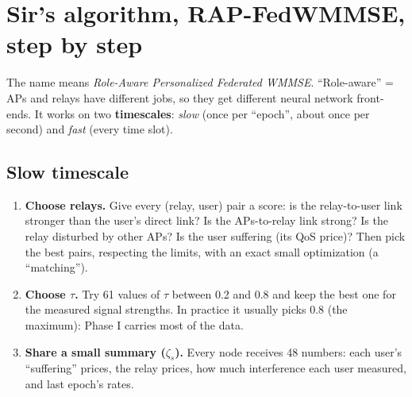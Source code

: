 \documentclass[11pt,a4paper]{article}
\newcommand{\key}[1]{\textbf{#1}}
\begin{document}
\begin{center}
\end{center}

\section{Sir's algorithm, RAP-FedWMMSE, step by step}

The name means \emph{Role-Aware Personalized Federated WMMSE}. ``Role-aware'' = APs and relays have different
jobs, so they get different neural network front-ends. It works on two \key{timescales}:
\emph{slow} (once per ``epoch'', about once per second) and \emph{fast} (every time slot).

\subsection*{Slow timescale}
\begin{enumerate}[label=\textbf{Step \arabic*.},leftmargin=4em]
\item \textbf{Choose relays.} Give every (relay, user) pair a score: is the relay-to-user link stronger than the
  user's direct link? Is the APs-to-relay link strong? Is the relay disturbed by other APs? Is the user suffering
  (its QoS price)? Then pick the best pairs, respecting the limits, with an exact small optimization (a
  ``matching'').
\item \textbf{Choose $\tau$.} Try 61 values of $\tau$ between 0.2 and 0.8 and keep the best one for the
  measured signal strengths. In practice it usually picks 0.8 (the maximum): Phase I carries most of the data.
\item[\textbf{Step 3}] \textbf{Share a small summary ($\zeta_s$).} Every node receives 48 numbers: each user's
  ``suffering'' prices, the relay prices, how much interference each user measured, and last epoch's rates.
\end{enumerate}
\end{document}
